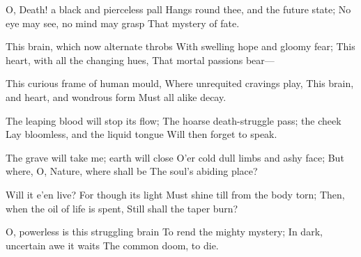 \documentclass[fontsize=9, a5paper]{scrbook}
\newcommand\blankpage{%
    \null
    \thispagestyle{empty}%
    \addtocounter{page}{-1}%
    \newpage}
\begin{document}
\afterpage{\blankpage}
\begin{poem}
	\begin{stanza}
		O, Death! a black and pierceless pall\verseline
		    \verseindent Hangs round thee, and the future state;\verseline
		No eye may see, no mind may grasp\verseline
		    \verseindent That mystery of fate.
	\end{stanza}
	
	\begin{stanza}
		This brain, which now alternate throbs\verseline
		    \verseindent With swelling hope and gloomy fear;\verseline
		This heart, with all the changing hues,\verseline
		    \verseindent That mortal passions bear—
	\end{stanza}
	
	\begin{stanza}
		This curious frame of human mould,\verseline
		    \verseindent Where unrequited cravings play,\verseline
		This brain, and heart, and wondrous form\verseline
		    \verseindent Must all alike decay.
	\end{stanza}
	
	\begin{stanza}
		The leaping blood will stop its flow;\verseline
		    \verseindent The hoarse death-struggle pass; the cheek\verseline
		Lay bloomless, and the liquid tongue\verseline
		    \verseindent Will then forget to speak.
	\end{stanza}
	
	\begin{stanza}
		The grave will take me; earth will close\verseline
		    \verseindent O’er cold dull limbs and ashy face;\verseline
		But where, O, Nature, where shall be\verseline
		    \verseindent The soul’s abiding place?
	\end{stanza}
	
	\begin{stanza}
		Will it e’en live? For though its light\verseline
		    \verseindent Must shine till from the body torn;\verseline
		Then, when the oil of life is spent,   \verseline
		    \verseindent Still shall the taper burn?
	\end{stanza}

	\begin{stanza}
		O, powerless is this struggling brain\verseline
		    \verseindent To rend the mighty mystery;\verseline
		In dark, uncertain awe it waits\verseline
		    \verseindent The common doom, to die.
	\end{stanza}
\end{poem}
\end{document}
